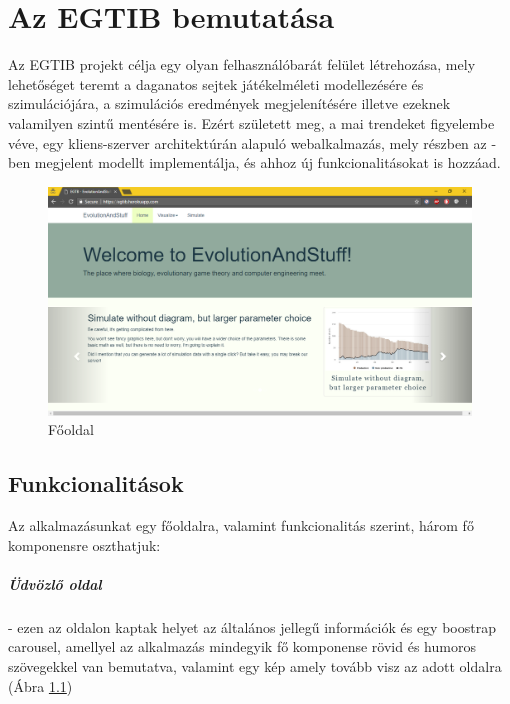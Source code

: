 \newcommand{\projectName}{Az EGTIB}

\chapter{\projectName{} bemutatása}

\projectName{} projekt célja egy olyan felhasználóbarát felület létrehozása, mely lehetőséget teremt a daganatos sejtek játékelméleti modellezésére és szimulációjára, a szimulációs eredmények megjelenítésére illetve ezeknek valamilyen szintű mentésére is. Ezért született meg, a mai trendeket figyelembe véve, egy kliens-szerver architektúrán alapuló webalkalmazás, mely részben az \cite{archetti2016cooperation}-ben megjelent modellt implementálja, és ahhoz új funkcionalitásokat is hozzáad.

\begin{figure}[ht!]
	\centering
	\includegraphics[width=0.98\linewidth]{images/welcomePage}
	\vspace*{1mm}
	\caption{Főoldal}
	\label{fig:welcomePage}
\end{figure}

\section{Funkcionalitások}

Az alkalmazásunkat egy főoldalra, valamint funkcionalitás szerint, három fő komponensre oszthatjuk:

\paragraph{Üdvözlő oldal}- ezen az oldalon kaptak helyet az általános jellegű információk és egy boostrap carousel, amellyel az alkalmazás mindegyik fő komponense rövid és humoros szövegekkel van bemutatva, valamint egy kép amely tovább visz az adott oldalra (Ábra \ref{fig:welcomePage})

